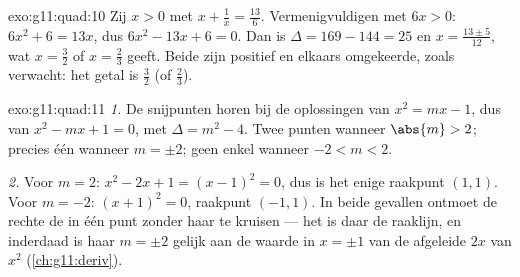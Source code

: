 \begin{solution}{exo:g11:quad:10}
Zij $x > 0$ met $x + \frac1x = \frac{13}{6}$. Vermenigvuldigen met
$6x > 0$: $6x^2 + 6 = 13x$, dus $6x^2 - 13x + 6 = 0$. Dan is
$\Delta = 169 - 144 = 25$ en $x = \frac{13 \pm 5}{12}$, wat $x = \frac32$ of
$x = \frac23$ geeft. Beide zijn positief en elkaars omgekeerde, zoals
verwacht: het getal is $\frac32$ (of $\frac23$).
\end{solution}

\begin{solution}{exo:g11:quad:11}
\emph{1.} De snijpunten horen bij de oplossingen van $x^2 = mx - 1$, dus van
$x^2 - mx + 1 = 0$, met  $\Delta = m^2 - 4$. Twee punten wanneer
$\abs{m} > 2$; precies één wanneer $m = \pm 2$; geen enkel wanneer
$-2 < m < 2$.

\emph{2.} Voor $m = 2$: $x^2 - 2x + 1 = (x-1)^2 = 0$, dus is het enige
raakpunt $(1, 1)$. Voor $m = -2$: $(x+1)^2 = 0$, raakpunt $(-1, 1)$. In
beide gevallen ontmoet de rechte de  in één punt zonder haar te
kruisen --- het is daar de raaklijn, en inderdaad is haar
 $m = \pm 2$ gelijk aan de waarde in $x = \pm 1$ van de
afgeleide $2x$ van $x^2$ (\cref{ch:g11:deriv}).
\end{solution}

